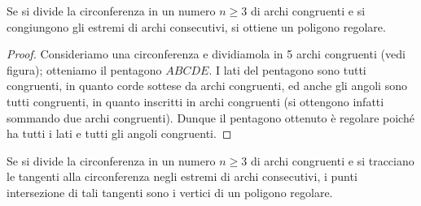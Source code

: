 \begin{inaccessibleblock}
 \begin{figure}[!htb]
	\begin{center}
		\begin{minipage}{0.45\textwidth}
			\centering
			
		\end{minipage}
		\hspace{0.03\textwidth}	
		\begin{minipage}{0.45\textwidth}
			\centering
			
		\end{minipage}
	\end{center}
\end{figure}
\end{inaccessibleblock}


\begin{teorema}
Se si divide la circonferenza in un numero $n\geq 3$ di archi 
congruenti e si congiungono gli estremi di archi consecutivi, si 
ottiene un poligono regolare.
\end{teorema}


\begin{inaccessibleblock}
 \begin{figure}[!htb]
	\centering
\end{figure}
\end{inaccessibleblock}

\begin{proof}
Consideriamo una circonferenza e dividiamola in 5 archi congruenti 
(vedi figura); otteniamo il pentagono $ABCDE$.
I lati del pentagono sono tutti congruenti, in quanto corde sottese 
da archi congruenti, ed anche gli angoli sono tutti congruenti, in 
quanto inscritti in archi congruenti (si ottengono infatti sommando 
due archi congruenti).
Dunque il pentagono ottenuto è regolare poiché ha tutti i lati e 
tutti gli angoli congruenti.
\end{proof}

\begin{teorema}
Se si divide la circonferenza in un numero $n\geq 3$ di archi 
congruenti e si tracciano le tangenti alla circonferenza negli  
estremi di archi consecutivi, i punti intersezione di tali tangenti 
sono i vertici di un poligono regolare.
\end{teorema}


\begin{inaccessibleblock}
 \begin{figure}[!htb]
	\centering
\end{figure}
\end{inaccessibleblock}


